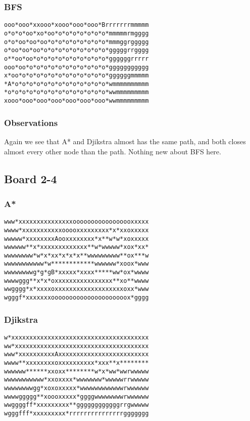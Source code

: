\documentclass[11pt,a4paper]{article}
\begin{document}
\subsubsection*{BFS}
\begin{lstlisting}
ooo*ooo*xxooo*xooo*ooo*ooo*Brrrrrrrmmmmm
o*o*o*oo*xo*oo*o*o*o*o*o*o*o*mmmmmrmgggg
o*o*oo*oo*oo*o*o*o*o*o*o*o*o*mmmggrggggg
o*oo*oo*oo*o*o*o*o*o*o*o*o*o*gggggrrgggg
o**oo*oo*o*o*o*o*o*o*o*o*o*o*ggggggrrrrr
ooo*oo*o*o*o*o*o*o*o*o*o*o*o*ggggggggggg
x*oo*o*o*o*o*o*o*o*o*o*o*o*o*ggggggmmmmm
*A*o*o*o*o*o*o*o*o*o*o*o*o*o*wmmmmmmmmmm
*o*o*o*o*o*o*o*o*o*o*o*o*o*o*wwmmmmmmmmm
xooo*ooo*ooo*ooo*ooo*ooo*ooo*wwmmmmmmmmm
\end{lstlisting}

\subsubsection*{Observations}
Again we see that A* and Djikstra almost has the same path, and both closes almost every other node than the path. 
Nothing new about BFS here.

\subsection*{Board 2-4}
\subsubsection*{A*}
\begin{lstlisting}
www*xxxxxxxxxxxxxxxooooooooooooooooxxxxx
wwww*xxxxxxxxxxxooooxxxxxxxxx*x*xxoxxxxx
wwwww*xxxxxxxxAooxxxxxxxx*x**w*w*xoxxxxx
wwwwww**x*xxxxxxxxxxxxx**w*wwwww*xox*xx*
wwwwwwww*w*x*xx*x*x*x**wwwwwwwww**ox***w
wwwwwwwwwww*w************wwwwww*xoox*www
wwwwwwwwg*g*gB*xxxxx*xxxx*****ww*ox*wwww
wwwwggg**x*x*oxxxxxxxxxxxxxxxx**xo**wwww
wwgggg*x*xxxxoxxxxxxxxxxxxxxxxxxxoxx*www
wgggf*xxxxxxxooooooooooooooooooooox*gggg
\end{lstlisting}

\subsubsection*{Djikstra}
\begin{lstlisting}
w*xxxxxxxxxxxxxxxxxxxxxxxxxxxxxxxxxxxxxx
ww*xxxxxxxxxxxxxxxxxxxxxxxxxxxxxxxxxxxxx
www*xxxxxxxxxxAxxxxxxxxxxxxxxxxxxxxxxxxx
wwww**xxxxxxxxoxxxxxxxxxx*xxx**x********
wwwwww******xxoxx********w*x*ww*wwrwwwww
wwwwwwwwwww*xxoxxxx*wwwwwww*wwwwwrrwwwww
wwwwwwwwgg*xoxoxxxxx*wwwwwwwwwwwwrwwwwww
wwwwggggg**xoooxxxxx*ggggwwwwwwwwrwwwwww
wwggggff*xxxxxxxxx**ggggggggggggrrgwwwww
wgggfff*xxxxxxxxx*rrrrrrrrrrrrrrrggggggg
\end{lstlisting}
\end{document}
